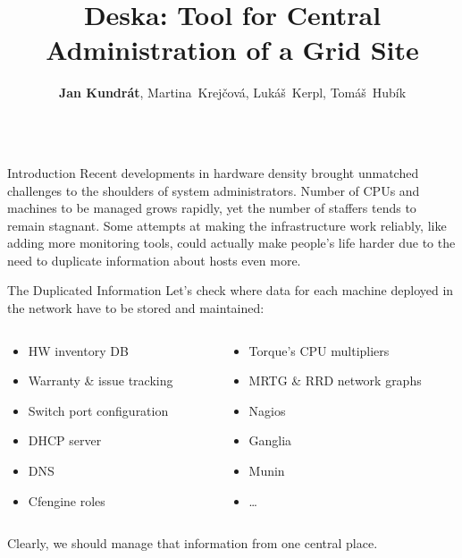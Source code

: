\documentclass{beamer}
\title{\Huge Deska: Tool for Central Administration of a Grid Site}
\author{\textbf{Jan Kundrát}, Martina~Krejčová, Lukáš~Kerpl, Tomáš~Hubík}
\institute[Institute of Physics]{Institute of Physics, AS CR, Prague, Czech
Republic}
\begin{document}
\begin{frame}[fragile]

\begin{columns}[t]

\begin{column}{.48\linewidth}
\begin{block}{Introduction}
Recent developments in hardware density brought unmatched \alert{challenges} to
the shoulders of system administrators.  Number of CPUs and machines to be
managed \alert{grows rapidly}, yet the number of staffers tends to remain
\alert{stagnant}.  Some attempts at making the infrastructure work reliably,
like adding more monitoring tools, could actually make people's life harder due
to the need to \alert{duplicate information} about hosts even more.
\end{block}

\begin{block}{The Duplicated Information}
Let's check where data for each machine deployed in the network have to be stored
and maintained:
\begin{columns}[T]
\begin{column}{.4\linewidth}
\begin{itemize}
    \item HW inventory DB
    \item Warranty \& issue tracking
    \item Switch port configuration
    \item DHCP server
    \item DNS
    \item Cfengine roles
\end{itemize}
\end{column}
\begin{column}{.5\linewidth}
\begin{itemize}
    \item Torque's CPU multipliers
    \item MRTG \& RRD network graphs
    \item Nagios
    \item Ganglia
    \item Munin
    \item \ldots
\end{itemize}
\end{column}
\end{columns}
\vspace{1em}

Clearly, we should manage that information from one \alert{central place}.
\end{block}


\end{column}
\end{columns}
\end{frame}
\end{document}
